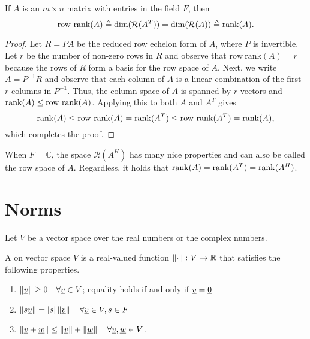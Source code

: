 \begin{theorem}
If $A$ is an $m \times n$ matrix with entries in the field $F$, then
\begin{equation*}
\mathrm{row~rank} (A) \triangleq \dim( \mathcal{R}(A^T)) =  \dim( \mathcal{R}(A)) \triangleq \mathrm{rank} (A).
\end{equation*}
\end{theorem}
\begin{proof}
Let $R=PA$ be the reduced row echelon form of $A$, where $P$ is invertible.
Let $r$ be the number of non-zero rows in $R$ and observe that $\mathrm{row~rank} (A) = r$ because the rows of $R$ form a basis for the row space of $A$.
Next, we write $A=P^{-1}R$ and observe that each column of $A$ is a linear combination of the first $r$ columns in $P^{-1}$.
Thus, the column space of $A$ is spanned by $r$ vectors and $\mathrm{rank} (A) \leq \mathrm{row~rank} (A)$.
Applying this to both $A$ and $A^T$ gives
\[ \mathrm{rank} (A) \leq \mathrm{row~rank} (A) = \mathrm{rank} (A^T) \leq \mathrm{row~rank} (A^T) = \mathrm{rank} (A),    \]
which completes the proof.
\end{proof}
When $F=\mathbb{C}$, the space $\mathcal{R}(A^H)$ has many nice properties and can also be called the row space of $A$.
Regardless, it holds that $\mathrm{rank}(A) = \mathrm{rank}(A^T) = \mathrm{rank}(A^H)$.



\section{Norms}

Let $V$ be a vector space over the real numbers or the complex numbers.

\begin{definition}
A  on vector space $V$ is a real-valued function $\left\| \cdot \right\| \colon V \rightarrow \mathbb{R}$ that satisfies the following properties.
\begin{enumerate}
\item $\left\| \underline{v} \right\| \geq 0 \quad \forall \underline{v} \in V$;
equality holds if and only if $\underline{v} = \underline{0}$
\item $\left\| s \underline{v} \right\| = |s| \left\| \underline{v} \right\| \quad \forall \underline{v} \in V, s \in F$
\item $\left\| \underline{v} + \underline{w} \right\| \leq
\left\| \underline{v} \right\| + \left\| \underline{w} \right\| \quad \forall \underline{v}, \underline{w} \in V$.
\end{enumerate}
\end{definition}

